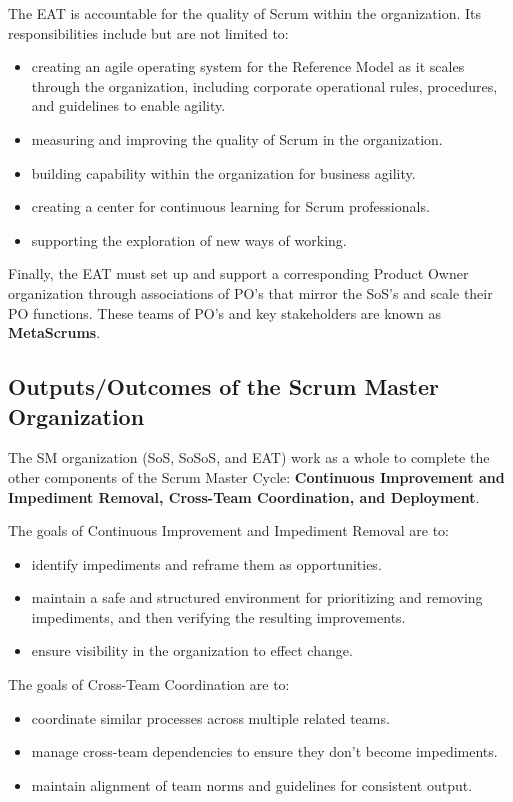 \documentclass[12pt,a4paper,parskip=full]{scrartcl}
\begin{document}
The EAT is accountable for the quality of Scrum within the organization.
Its responsibilities include but are not limited to:
\begin{itemize}
\item creating an agile operating system for the Reference Model as it
scales through the organization, including corporate operational rules,
procedures, and guidelines to enable agility.
\item measuring and improving the quality of Scrum in the organization.
\item building capability within the organization for business agility.
\item creating a center for continuous learning for Scrum professionals.
\item supporting the exploration of new ways of working.
\end{itemize}
Finally, the EAT must set up and support a corresponding Product Owner
organization through associations of PO's that mirror the SoS's and scale
their PO functions. These teams of PO's and key stakeholders are known as
\textbf{MetaScrums}.

\subsection{Outputs/Outcomes of the Scrum Master Organization}
The SM organization (SoS, SoSoS, and EAT) work as a whole to complete the
other components of the Scrum Master Cycle: \textbf{Continuous Improvement
and Impediment Removal, Cross-Team Coordination, and Deployment}.

The goals of Continuous Improvement and Impediment Removal are to:
\begin{itemize}
\item identify impediments and reframe them as opportunities.
\item maintain a safe and structured environment for prioritizing and
removing impediments, and then verifying the resulting improvements.
\item ensure visibility in the organization to effect change.
\end{itemize}
The goals of Cross-Team Coordination are to:
\begin{itemize}
\item coordinate similar processes across multiple related teams.
\item manage cross-team dependencies to ensure they don't become
impediments.
\item maintain alignment of team norms and guidelines for consistent output.
\end{itemize}
\end{document}
